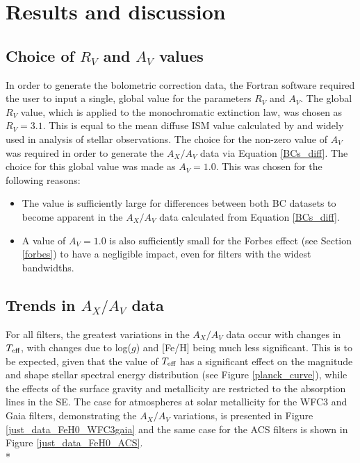 \documentclass[12pt, a4paper]{report}
\begin{document}
\chapter{Results and discussion}

\section{Choice of $R_{V}$ and $A_{V}$ values}
In order to generate the bolometric correction data, the Fortran software required the user to input a single, global value for the parameters $R_{V}$ and $A_{V}$. The global $R_{V}$ value, which is applied to the \cite{1989ApJ...345..245C} monochromatic extinction law, was chosen as $R_{V} = 3.1$. This is equal to the mean diffuse ISM value calculated by \cite{1985ApJ...288..618R} and widely used in analysis of stellar observations. The choice for the non-zero value of $A_{V}$ was required in order to generate the $A_{X}/A_{V}$ data via Equation \ref{BCs_diff}. The choice for this global value was made as $A_{V} = 1.0$. This was chosen for the following reasons:

\begin{itemize}
\item The value is sufficiently large for differences between both BC datasets to become apparent in the $A_{X}/A_{V}$ data calculated from Equation \ref{BCs_diff}.
\item A value of $A_{V} = 1.0$ is also sufficiently small for the Forbes effect (see Section \ref{forbes}) to have a negligible impact, even for filters with the widest bandwidths.
\end{itemize}

\section{Trends in $A_{X}/A_{V}$ data}
For all filters, the greatest variations in the $A_{X}/A_{V}$ data occur with changes in $T_{\textnormal{eff}}$, with changes due to log($g$) and [Fe/H] being much less significant. This is to be expected, given that the value of $T_{\textnormal{eff}}$ has a significant effect on the magnitude and shape stellar spectral energy distribution (see Figure \ref{planck_curve}), while the effects of the surface gravity and metallicity are restricted to the absorption lines in the SE. The case for atmospheres at solar metallicity for the WFC3 and Gaia filters, demonstrating the $A_{X}/A_{V}$ variations, is presented in Figure \ref{just_data_FeH0_WFC3gaia} and the same case for the ACS filters is shown in Figure \ref{just_data_FeH0_ACS}. \\*
\end{document}
